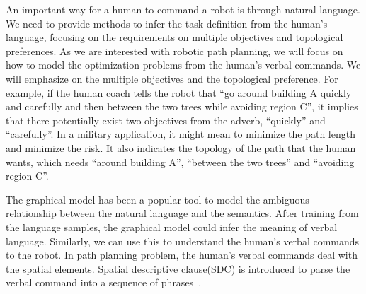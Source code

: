 \documentclass[phd]{byuprop}
\begin{document}
An important way for a human to command a robot is through natural language.
We need to provide methods to infer the task definition from the human's language, focusing on the requirements on multiple objectives and topological preferences.
As we are interested with robotic path planning, we will focus on how to model the optimization problems from the human's verbal commands.
We will emphasize on the multiple objectives and the topological preference.
For example, if the human coach tells the robot that ``go around building A quickly and carefully and then between the two trees while avoiding region C'',
it implies that there potentially exist two objectives from the adverb, ``quickly'' and ``carefully''.
In a military application, it might mean to minimize the path length and minimize the risk.
It also indicates the topology of the path that the human wants, which needs ``around building A'', ``between the two trees'' and ``avoiding region C''.

The graphical model has been a popular tool to model the ambiguous relationship between the natural language and the semantics.
After training from the language samples, the graphical model could infer the meaning of verbal language.
Similarly, we can use this to understand the human's verbal commands to the robot.
In path planning problem, the human's verbal commands deal with the spatial elements. 
Spatial descriptive clause(SDC) is introduced to parse the verbal command into a sequence of phrases~\cite{Kollar:2010:TUN:1734454.1734553}.
\end{document}
